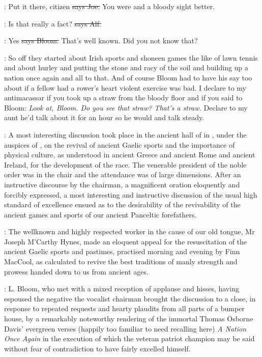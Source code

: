 \joe:
Put it there,
citizen
\sout{says Joe.}
You were and a bloody sight better.

\bergan:
Is that really a fact?
\sout{says Alf.}

\Bloom:
Yes
\sout{says Bloom.}
That's well known.
Did you not know that?

\Nq:
So off they started about Irish sports and shoneen games the like of lawn
tennis and about hurley
and putting the stone and racy of the soil and
building up a nation once again and all to that.
And of course Bloom had
to have his say too about if a fellow had a rower's heart violent
exercise was bad.
I declare to my antimacassar if you took up a
straw from the bloody floor and if you said to Bloom:
\emph{Look at,
Bloom.
Do you see that straw?
That's a straw.} Declare to my aunt he'd talk
about it for an hour so he would and talk steady.

:
A most interesting discussion took place in the ancient hall of
 in ,
under the auspices of ,
on the revival of ancient Gaelic sports and the importance of
physical culture,
as understood in ancient Greece and ancient Rome and
ancient Ireland,
for the development of the race.
The venerable president
of the noble order was in the chair and the attendance was of large
dimensions.
After an instructive discourse by the chairman,
a magnificent
oration eloquently and forcibly expressed,
a most interesting and
instructive discussion of the usual high standard of excellence
ensued as to the desirability of the revivability of the ancient
games and sports of our ancient Panceltic forefathers.

:
The wellknown and highly respected worker in the cause of our old
tongue,
Mr Joseph M'Carthy Hynes,
made an eloquent appeal for
the resuscitation of the ancient Gaelic sports and pastimes,
practised morning and evening by Finn MacCool,
as calculated to revive the
best traditions of manly strength and prowess handed down to us from
ancient ages.

:
L.
Bloom,
who met with a mixed reception of applause and
hisses,
having espoused the negative the vocalist chairman brought the
discussion to a close,
in response to repeated requests and hearty
plaudits from all parts of a bumper house,
by a remarkably noteworthy
rendering of the immortal Thomas Osborne Davis' evergreen verses (happily
too familiar to need recalling here) \emph{A Nation Once Again} in the execution
of which the veteran patriot champion may be said without fear of
contradiction to have fairly excelled himself.

